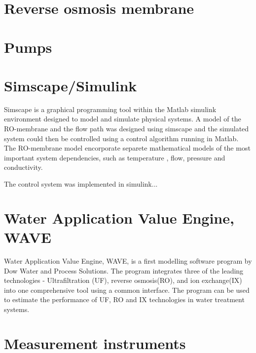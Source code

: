 
\section{Reverse osmosis membrane}


\section{Pumps}

\section{Simscape/Simulink}

Simscape is a graphical programming tool within the Matlab simulink environment designed to model and simulate physical systems. A model of the RO-membrane and the flow path was designed using simscape and the simulated system could then be controlled using a control algorithm running in Matlab.  The RO-membrane model encorporate separete mathematical models of the most important system dependencies, such as temperature  , flow, pressure and conductivity.  

The control system was implemented in simulink...


\section{Water Application Value Engine, WAVE} \label{WAVE}
Water Application Value Engine, WAVE, is a first modelling software program by Dow Water and Process Solutions. The program integrates three of the leading technologies - Ultrafiltration (UF), reverse osmosis(RO), and ion exchange(IX) into one comprehensive tool using a common interface. The program can be used to estimate the performance of UF, RO and IX technologies in water treatment systems. \cite{DOW}



\section{Measurement instruments}


